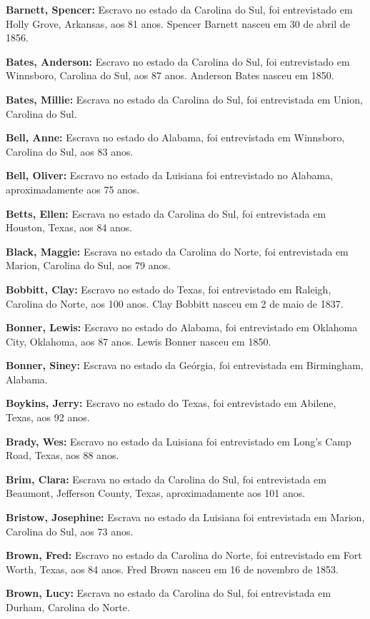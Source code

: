 \textbf{Barnett, Spencer:} Escravo no estado da Carolina do Sul, foi
entrevistado em Holly Grove, Arkansas, aos 81 anos. Spencer Barnett
nasceu em 30 de abril de 1856.

\textbf{Bates, Anderson:} Escravo no estado da Carolina do Sul, foi
entrevistado em Winnsboro, Carolina do Sul, aos 87 anos. Anderson Bates
nasceu em 1850.

\textbf{Bates, Millie:} Escrava no estado da Carolina do Sul, foi
entrevistada em Union, Carolina do Sul.

\textbf{Bell, Anne:} Escrava no estado do Alabama, foi entrevistada em
Winnsboro, Carolina do Sul, aos 83 anos.

\textbf{Bell, Oliver:} Escravo no estado da Luisiana foi entrevistado no
Alabama, aproximadamente aos 75 anos.

\textbf{Betts, Ellen:} Escrava no estado da Carolina do Sul, foi
entrevistada em Houston, Texas, aos 84 anos.

\textbf{Black, Maggie:} Escrava no estado da Carolina do Norte, foi
entrevistada em Marion, Carolina do Sul, aos 79 anos.

\textbf{Bobbitt, Clay:} Escravo no estado do Texas, foi entrevistado em
Raleigh, Carolina do Norte, aos 100 anos. Clay Bobbitt nasceu em 2 de
maio de 1837.

\textbf{Bonner, Lewis:} Escravo no estado do Alabama, foi entrevistado
em Oklahoma City, Oklahoma, aos 87 anos. Lewis Bonner nasceu em 1850.

\textbf{Bonner, Siney:} Escrava no estado da Geórgia, foi entrevistada
em Birmingham, Alabama.

\textbf{Boykins, Jerry:} Escravo no estado do Texas, foi entrevistado em
Abilene, Texas, aos 92 anos.

\textbf{Brady, Wes:} Escravo no estado da Luisiana foi entrevistado em
Long's Camp Road, Texas, aos 88 anos.

\textbf{Brim, Clara:} Escrava no estado da Carolina do Sul, foi
entrevistada em Beaumont, Jefferson County, Texas, aproximadamente aos
101 anos.

\textbf{Bristow, Josephine:} Escrava no estado da Luisiana foi
entrevistada em Marion, Carolina do Sul, aos 73 anos.

\textbf{Brown, Fred:} Escravo no estado da Carolina do Norte, foi
entrevistado em Fort Worth, Texas, aos 84 anos. Fred Brown nasceu em 16
de novembro de 1853.

\textbf{Brown, Lucy:} Escrava no estado da Carolina do Sul, foi
entrevistada em Durham, Carolina do Norte.

